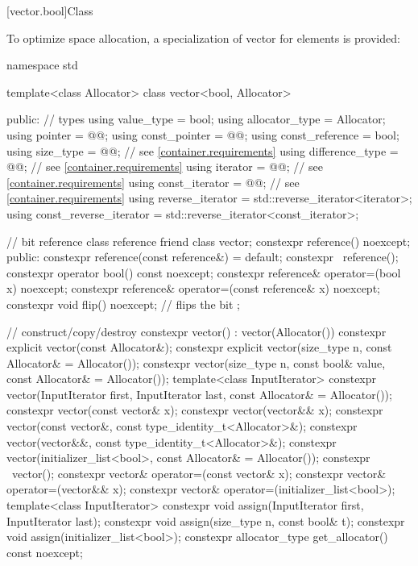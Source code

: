 [vector.bool]{Class }

\pnum
{}%
To optimize space allocation, a specialization of vector for
elements is provided:
\begin{codeblock}
namespace std {
  template<class Allocator>
  class vector<bool, Allocator> {
  public:
    // types
    using value_type             = bool;
    using allocator_type         = Allocator;
    using pointer                = @@;
    using const_pointer          = @@;
    using const_reference        = bool;
    using size_type              = @@; // see \ref{container.requirements}
    using difference_type        = @@; // see \ref{container.requirements}
    using iterator               = @@; // see \ref{container.requirements}
    using const_iterator         = @@; // see \ref{container.requirements}
    using reverse_iterator       = std::reverse_iterator<iterator>;
    using const_reverse_iterator = std::reverse_iterator<const_iterator>;

    // bit reference
    class reference {
      friend class vector;
      constexpr reference() noexcept;
    public:
      constexpr reference(const reference&) = default;
      constexpr ~reference();
      constexpr operator bool() const noexcept;
      constexpr reference& operator=(bool x) noexcept;
      constexpr reference& operator=(const reference& x) noexcept;
      constexpr void flip() noexcept;   // flips the bit
    };

    // construct/copy/destroy
    constexpr vector() : vector(Allocator()) { }
    constexpr explicit vector(const Allocator&);
    constexpr explicit vector(size_type n, const Allocator& = Allocator());
    constexpr vector(size_type n, const bool& value, const Allocator& = Allocator());
    template<class InputIterator>
      constexpr vector(InputIterator first, InputIterator last, const Allocator& = Allocator());
    constexpr vector(const vector& x);
    constexpr vector(vector&& x);
    constexpr vector(const vector&, const type_identity_t<Allocator>&);
    constexpr vector(vector&&, const type_identity_t<Allocator>&);
    constexpr vector(initializer_list<bool>, const Allocator& = Allocator());
    constexpr ~vector();
    constexpr vector& operator=(const vector& x);
    constexpr vector& operator=(vector&& x);
    constexpr vector& operator=(initializer_list<bool>);
    template<class InputIterator>
      constexpr void assign(InputIterator first, InputIterator last);
    constexpr void assign(size_type n, const bool& t);
    constexpr void assign(initializer_list<bool>);
    constexpr allocator_type get_allocator() const noexcept;

}}
\end{codeblock}
